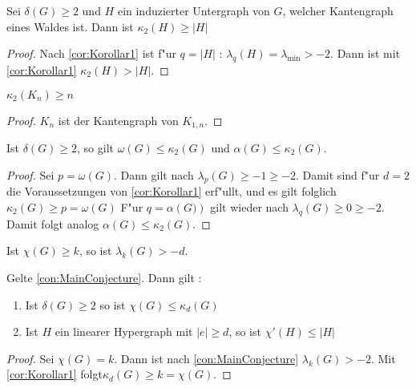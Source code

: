 \begin{corollary}
    Sei $\delta(G) \geq 2$ und $H$ ein induzierter Untergraph von $G$, welcher Kantengraph eines Waldes ist. 
    Dann ist $\kappa_{2}(H)\geq \left|H\right|$
\end{corollary}

\begin{proof}
    Nach \ref{cor:Korollar1} ist f"ur $q=\left|H\right|$ : $\lambda_q(H)=\lambda_{\text{min}}> -2$. Dann ist mit \ref{cor:Korollar1} $\kappa_{2}\left( H \right) > \left| H\right|$.
\end{proof}

\begin{corollary}[Klotz]
    $\kappa_{2}\left( K_n \right) \geq n$
\end{corollary}

\begin{proof}
    $K_n$ ist der Kantengraph von $K_{1,n}$.
\end{proof}
\begin{corollary}
    Ist $\delta\left( G \right) \geq 2$, so gilt $\omega\left( G \right)\leq \kappa_{2}\left( G \right)$ und $\alpha\left( G \right)\leq \kappa_{2}\left( G \right)$.
\end{corollary}

\begin{proof}
    Sei $p = \omega(G)$. Dann gilt nach $\lambda_{p}\left( G \right)\geq -1\geq -2$. Damit sind f"ur $d=2$ die Voraussetzungen von \ref{cor:Korollar1} erf"ullt, und es gilt folglich $\kappa_{2}\left( G \right)\geq p = \omega\left( G \right)$ 
    F"ur $q=\alpha\left( G) \right)$ gilt wieder nach $\lambda_{q}\left( G \right)\geq 0 \geq -2$. Damit folgt analog $\alpha\left( G \right) \leq \kappa_{2}\left( G \right)$.
\end{proof}
\begin{conjecture}
    \label{con:MainConjecture}
    Ist $\chi\left( G \right) \geq k$, so ist $\lambda_k\left( G \right) > -d$.
\end{conjecture}

\begin{theorem}
    \label{thm:MainTheorem}
    Gelte \ref{con:MainConjecture}. Dann gilt :
    \begin{enumerate}[label=(\roman*)]
        \item Ist $\delta\left( G \right) \geq 2$ so ist $\chi\left( G \right)\leq \kappa_{d}\left( G \right)$
        \item  Ist $H$ ein linearer Hypergraph mit $\left|e\right| \geq d$, so ist $\chi'\left( H \right)\leq \left|H\right| $
    \end{enumerate}
\end{theorem}

\begin{proof}
    Sei $\chi(G) = k$. Dann ist nach \ref{con:MainConjecture} $\lambda_{k}\left( G \right) > -2$. Mit \ref{cor:Korollar1} folgt$\kappa_{d}\left( G \right) \geq k = \chi\left( G \right)$.
\end{proof}
